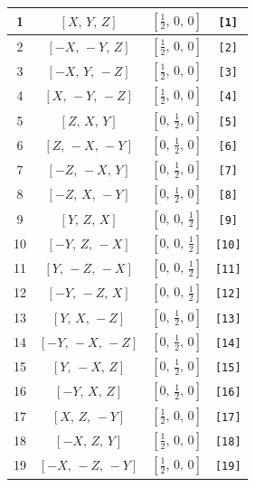 \documentclass[fleqn,8pt]{jsarticle}
\begin{document}
\begin{longtable}{cccc}
1 & $\left[ X,\, Y,\, Z \right]$ & $\left[ \frac{1}{2},\, 0,\, 0 \right]$ & {\tt [1]} \\ \hline
2 & $\left[ - X,\, - Y,\, Z \right]$ & $\left[ \frac{1}{2},\, 0,\, 0 \right]$ & {\tt [2]} \\ \hline
3 & $\left[ - X,\, Y,\, - Z \right]$ & $\left[ \frac{1}{2},\, 0,\, 0 \right]$ & {\tt [3]} \\ \hline
4 & $\left[ X,\, - Y,\, - Z \right]$ & $\left[ \frac{1}{2},\, 0,\, 0 \right]$ & {\tt [4]} \\ \hline
5 & $\left[ Z,\, X,\, Y \right]$ & $\left[ 0,\, \frac{1}{2},\, 0 \right]$ & {\tt [5]} \\ \hline
6 & $\left[ Z,\, - X,\, - Y \right]$ & $\left[ 0,\, \frac{1}{2},\, 0 \right]$ & {\tt [6]} \\ \hline
7 & $\left[ - Z,\, - X,\, Y \right]$ & $\left[ 0,\, \frac{1}{2},\, 0 \right]$ & {\tt [7]} \\ \hline
8 & $\left[ - Z,\, X,\, - Y \right]$ & $\left[ 0,\, \frac{1}{2},\, 0 \right]$ & {\tt [8]} \\ \hline
9 & $\left[ Y,\, Z,\, X \right]$ & $\left[ 0,\, 0,\, \frac{1}{2} \right]$ & {\tt [9]} \\ \hline
10 & $\left[ - Y,\, Z,\, - X \right]$ & $\left[ 0,\, 0,\, \frac{1}{2} \right]$ & {\tt [10]} \\ \hline
11 & $\left[ Y,\, - Z,\, - X \right]$ & $\left[ 0,\, 0,\, \frac{1}{2} \right]$ & {\tt [11]} \\ \hline
12 & $\left[ - Y,\, - Z,\, X \right]$ & $\left[ 0,\, 0,\, \frac{1}{2} \right]$ & {\tt [12]} \\ \hline
13 & $\left[ Y,\, X,\, - Z \right]$ & $\left[ 0,\, \frac{1}{2},\, 0 \right]$ & {\tt [13]} \\ \hline
14 & $\left[ - Y,\, - X,\, - Z \right]$ & $\left[ 0,\, \frac{1}{2},\, 0 \right]$ & {\tt [14]} \\ \hline
15 & $\left[ Y,\, - X,\, Z \right]$ & $\left[ 0,\, \frac{1}{2},\, 0 \right]$ & {\tt [15]} \\ \hline
16 & $\left[ - Y,\, X,\, Z \right]$ & $\left[ 0,\, \frac{1}{2},\, 0 \right]$ & {\tt [16]} \\ \hline
17 & $\left[ X,\, Z,\, - Y \right]$ & $\left[ \frac{1}{2},\, 0,\, 0 \right]$ & {\tt [17]} \\ \hline
18 & $\left[ - X,\, Z,\, Y \right]$ & $\left[ \frac{1}{2},\, 0,\, 0 \right]$ & {\tt [18]} \\ \hline
19 & $\left[ - X,\, - Z,\, - Y \right]$ & $\left[ \frac{1}{2},\, 0,\, 0 \right]$ & {\tt [19]} \\ \hline

\end{longtable}
\end{document}
